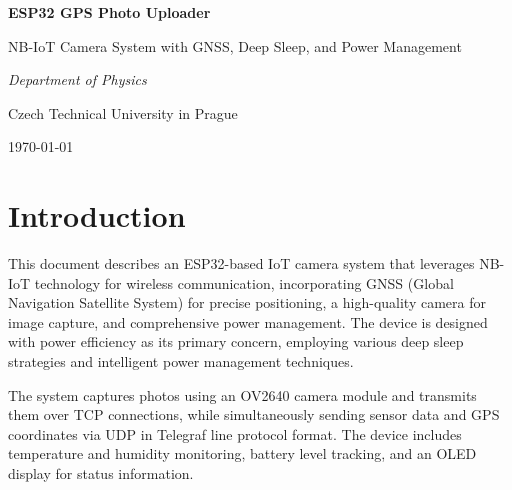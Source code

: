 \documentclass[11pt,a4paper]{article}
\begin{document}
\begin{titlepage}
    \centering
    \vspace*{1cm}
    \vspace{1.5cm}
    {\Huge\bfseries ESP32 GPS Photo Uploader\par}
    \vspace{1cm}
    {\Large NB-IoT Camera System with GNSS, Deep Sleep, and Power Management\par}
    \vspace{1.5cm}
    {\Large\itshape Department of Physics\par}
    {\Large Czech Technical University in Prague\par}
    \vfill
    {\large \today\par}
\end{titlepage}

\tableofcontents
\newpage

\section{Introduction}

This document describes an ESP32-based IoT camera system that leverages NB-IoT technology for wireless communication, incorporating GNSS (Global Navigation Satellite System) for precise positioning, a high-quality camera for image capture, and comprehensive power management. The device is designed with power efficiency as its primary concern, employing various deep sleep strategies and intelligent power management techniques.

The system captures photos using an OV2640 camera module and transmits them over TCP connections, while simultaneously sending sensor data and GPS coordinates via UDP in Telegraf line protocol format. The device includes temperature and humidity monitoring, battery level tracking, and an OLED display for status information.
\end{document}
